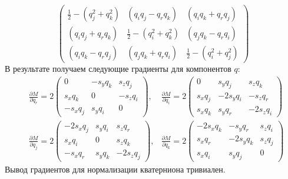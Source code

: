\begin{appendix}
\begin{equation}
\begin{pmatrix}
            \frac{1}{2} - (q_j^2 + q_k^2) & (q_i q_j - q_r q_k) & (q_i q_k + q_r q_j)\\
            (q_i q_j + q_r q_k) & \frac{1}{2} - (q_i^2 + q_k^2) & (q_j q_k - q_r q_i)\\
            (q_i q_k - q_r q_j) & (q_j q_k + q_r q_i) & \frac{1}{2} - (q_i^2 + q_j^2)
        \end{pmatrix}
        \label{eq:quat}
    \end{equation}
    В результате получаем следующие градиенты для компонентов $q$:
    \begin{equation}
        \begin{aligned}
            &\frac{\partial M}{\partial q_r} = 2 \left(\begin{smallmatrix}
                0 & -s_y q_k & s_z q_j\\
                s_x q_k & 0 & -s_z q_i\\
                -s_x q_j & s_y q_i & 0
            \end{smallmatrix}\right), 
            &\frac{\partial M}{\partial q_i} = 2\left(\begin{smallmatrix}
                0 & s_y q_j & s_z q_k\\
                s_x q_j & -2 s_y q_i & -s_z q_r\\
                s_x q_k & s_y q_r & -2 s_z q_i
            \end{smallmatrix}\right)
            \\
            &\frac{\partial M}{\partial q_j} = 2\left(\begin{smallmatrix}
                -2 s_x q_j & s_y q_i & s_z q_r\\
                s_x q_i & 0 & s_z q_k\\
                -s_x q_r & s_y q_k & -2s_z q_j
            \end{smallmatrix}\right),
            &\frac{\partial M}{\partial q_k} = 2\left(\begin{smallmatrix}
                -2 s_x q_k & -s_y q_r & s_z q_i\\
                s_x q_r & -2s_y q_k & s_z q_j\\
                s_x q_i & s_y q_j & 0
            \end{smallmatrix}\right)
        \end{aligned}
    \end{equation} 
Вывод градиентов для нормализации кватерниона тривиален.

\end{appendix}
